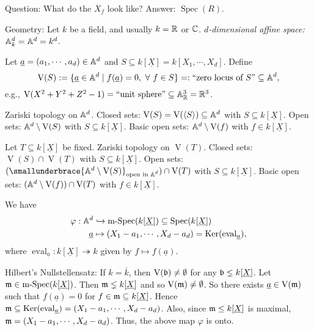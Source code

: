 \begin{remark}
    Question: What do the $X_f$ look like? Answer: $\operatorname{Spec}(R)$.
\end{remark}

\begin{remark}
    Geometry: Let $k$ be a field, and usually $k = \mathbb{R}$ or $\mathbb{C}$. \emph{$d$-dimensional affine space:} $\mathbb{A}^d_k = \mathbb{A}^d = k^d$. \par 
    Let $\underline a = (a_1,\cdots,a_d) \in \mathbb{A}^d$ and $S \subseteq k[\underline X] = k[X_1,\cdots,X_d]$. Define
    \[\operatorname{V}(S) := \{\underline a \in \mathbb{A}^d \mid f(\underline a) = 0,\ \forall \  f \in S\} =: \text{``zero locus of $S$''} \subseteq \mathbb{A}^d,\] 
    e.g., $\operatorname{V}(X^2+Y^2+Z^2-1) = \text{``unit sphere''} \subseteq \mathbb{A}^3_{\mathbb{R}} = \mathbb{R}^3$. \par 
    Zariski topology on $\mathbb{A}^d$. Closed sets: $\operatorname{V}(S) = \operatorname{V}(\langle S \rangle) \subseteq \mathbb{A}^d$ with $S \subseteq k[\underline X]$. Open sets: $\mathbb{A}^d \setminus \operatorname{V}(S)$ with $S \subseteq k[\underline X]$. Basic open sets: $\mathbb{A}^d \setminus \operatorname{V}(f)$ with $f \in k[\underline X]$. \par 
    Let $T \subseteq k[\underline X]$ be fixed. Zariski topology on $\operatorname{V}(T)$. Closed sets: $\operatorname{V}(S) \cap \operatorname{V}(T)$ with $S \subseteq k[\underline X]$. Open sets: $(\smallunderbrace{\bbA^d \setminus \operatorname{V}(S)}_{\text{open in $\bbA^d$}}) \cap \operatorname{V}(T)$ with $S \subseteq k[\underline X]$.  Basic open sets: $(\mathbb{A}^d \setminus \operatorname{V}(f)) \cap \operatorname{V}(T)$ with $f \in k[\underline X]$. \par 
    We have 
    \begin{align*}
        \varphi: \mathbb{A}^d &\hookrightarrow \operatorname{m-Spec}(k[\underline X]) \subseteq \operatorname{Spec}(k[\underline X]) \\
        \underline a &\mapsto (X_1-a_1,\cdots,X_d-a_d) = \operatorname{Ker}(\operatorname{eval}_{\underline a}), 
    \end{align*}
    where $\operatorname{eval}_{\underline a}: k[\underline X] \twoheadrightarrow k$ given by $f \mapsto f(\underline a)$. \par 
    Hilbert's Nullstellensatz: If $k = \overline k$, then $\operatorname{V}(\mathfrak{b}) \neq \emptyset$ for any $\mathfrak{b} \lneq k[\underline X]$. Let $\mathfrak{m} \in \operatorname{m-Spec}(k[\underline X])$. Then $\mathfrak{m} \lneq k[\underline X]$ and so $\operatorname{V}(\mathfrak{m}) \neq \emptyset$. So there exists $\underline a \in \operatorname{V}(\mathfrak{m})$ such that $f(\underline a) = 0$ for $f \in \mathfrak{m} \subseteq k[\underline X]$. Hence $\mathfrak{m} \subseteq \operatorname{Ker}(\operatorname{eval}_{\underline a}) = (X_1-a_1,\cdots,X_d-a_d)$. Also, since $\mathfrak{m} \leq k[\underline X]$ is maximal, $\mathfrak{m} = (X_1-a_1,\cdots,X_d-a_d)$. Thus, the above map $\varphi$ is onto. \par 

\end{remark}
